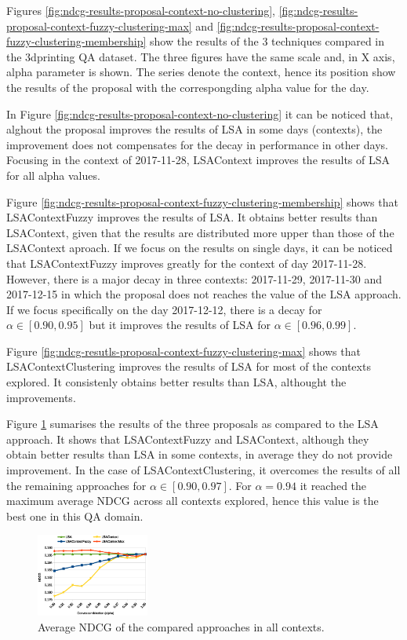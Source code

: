 \documentclass[preprint]{elsarticle}
\begin{document}
\begin{spacing}{1.5}
Figures \ref{fig:ndcg-results-proposal-context-no-clustering}, \ref{fig:ndcg-results-proposal-context-fuzzy-clustering-max} and \ref{fig:ndcg-results-proposal-context-fuzzy-clustering-membership} show the results of the 3 techniques compared in the 3dprinting QA dataset. The three figures have the same scale and, in X axis, alpha parameter is shown. The series denote the context, hence its position show the results of the proposal with the correspongding alpha value for the day.

In Figure \ref{fig:ndcg-results-proposal-context-no-clustering} it can be noticed that, alghout the proposal improves the results of LSA in some days (contexts), the improvement does not compensates for the decay in performance in other days. Focusing in the context of 2017-11-28, LSAContext improves the results of LSA for all alpha values.

Figure \ref{fig:ndcg-results-proposal-context-fuzzy-clustering-membership} shows that LSAContextFuzzy improves the results of LSA. It obtains better results than LSAContext, given that the results are distributed more upper than those of the LSAContext aproach. If we focus on the results on single days, it can be noticed that LSAContextFuzzy improves greatly for the context of day 2017-11-28. However, there is a major decay in three contexts: 2017-11-29, 2017-11-30 and 2017-12-15 in which the proposal does not reaches the value of the LSA approach. If we focus specifically on the day 2017-12-12, there is a decay for $\alpha \in [0.90,0.95]$ but it improves the results of LSA for $\alpha \in [0.96,0.99]$.

Figure \ref{fig:ndcg-resutls-proposal-context-fuzzy-clustering-max} shows that LSAContextClustering improves the results of LSA for most of the contexts explored. It consistenly obtains better results than LSA, althought the improvements.

Figure \ref{fig:ndcg-results-3proposals-average} sumarises the results of the three proposals as compared to the LSA approach. It shows that LSAContextFuzzy and LSAContext, although they obtain better results than LSA in some contexts, in average they do not provide improvement. In the case of LSAContextClustering, it overcomes the results of all the remaining approaches for $\alpha \in [0.90,0.97]$. For $\alpha=0.94$ it reached the maximum average NDCG across all contexts explored, hence this value is the best one in this QA domain.

\begin{figure}[htb]
    \centering
    \includegraphics[width=0.33\textwidth]{figures/ndcg-results-3proposals-average.eps}
    \caption{Average NDCG of the compared approaches in all contexts.}
    \label{fig:ndcg-results-3proposals-average}
\end{figure}


\end{spacing}
\end{document}
